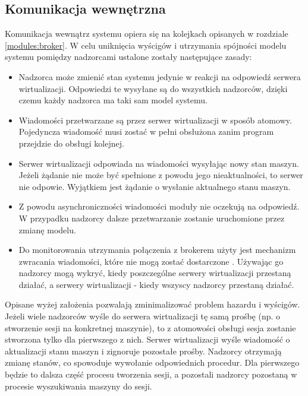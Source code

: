 \documentclass[../opis-rozwiazania.tex]{subfiles}
\begin{document}
\label{communication}

\subsection{Komunikacja wewnętrzna}
\label{communication:broker}

Komunikacja wewnątrz systemu opiera się na kolejkach opisanych w rozdziale \ref{modules:broker}. W celu uniknięcia wyścigów i utrzymania spójności modelu systemu pomiędzy nadzorcami ustalone zostały następujące zasady:
\begin{itemize}
  \item Nadzorca może zmienić stan systemu jedynie w reakcji na odpowiedź serwera wirtualizacji. Odpowiedzi te wysyłane są do wszystkich nadzorców, dzięki czemu każdy nadzorca ma taki sam model systemu.
  \item Wiadomości przetwarzane są przez serwer wirtualizacji w sposób atomowy. Pojedyncza wiadomość musi zostać w pełni obsłużona zanim program przejdzie do obsługi kolejnej.
  \item Serwer wirtualizacji odpowiada na wiadomości wysyłając nowy stan maszyn. Jeżeli żądanie nie może być spełnione z powodu jego nieaktualności, to serwer nie odpowie. Wyjątkiem jest żądanie o wysłanie aktualnego stanu maszyn.
  \item Z powodu asynchroniczności wiadomości moduły nie oczekują na odpowiedź. W przypadku nadzorcy dalsze przetwarzanie zostanie uruchomione przez zmianę modelu.
  \item Do monitorowania utrzymania połączenia z brokerem użyty jest mechanizm zwracania wiadomości, które nie mogą zostać dostarczone \parencite{rabbit-unroutable}. Używając go nadzorcy mogą wykryć, kiedy poszczególne serwery wirtualizacji przestaną działać, a serwery wirtualizacji - kiedy wszyscy nadzorcy przestaną działać.
\end{itemize}

Opisane wyżej założenia pozwalają zminimalizować problem hazardu i wyścigów. Jeżeli wiele nadzorców wyśle do serwera wirtualizacji tę samą prośbę (np. o stworzenie sesji na konkretnej maszynie), to z atomowości obsługi sesja zostanie stworzona tylko dla pierwszego z nich. Serwer wirtualizacji wyśle wiadomość o aktualizacji stanu maszyn i zignoruje pozostałe prośby. Nadzorcy otrzymają zmianę stanów, co spowoduje wywołanie odpowiednich procedur. Dla pierwszego będzie to dalsza część procesu tworzenia sesji, a pozostali nadzorcy pozostaną w procesie wyszukiwania maszyny do sesji.
\end{document}

